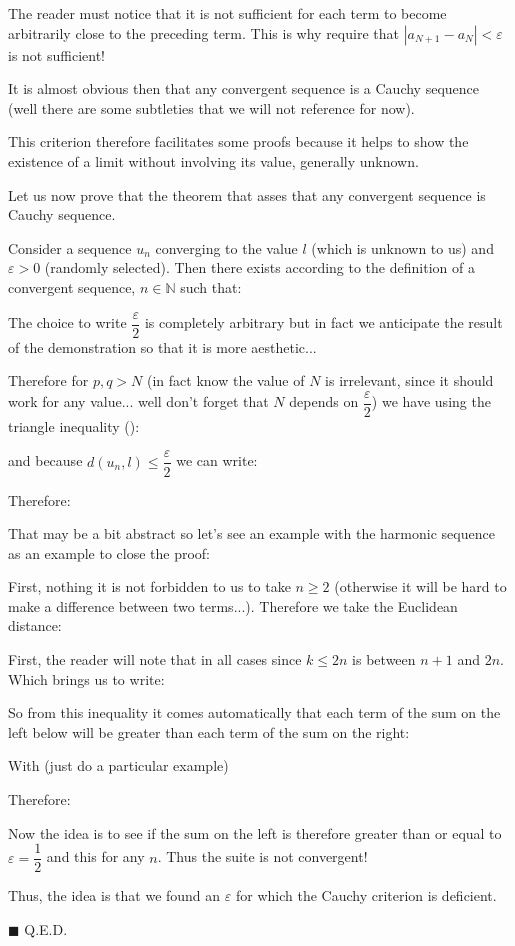 	The reader must notice that it is not sufficient for each term to become arbitrarily close to the preceding term. This is why require that $|a_{N+1} - a_{N}| < \varepsilon$ is not sufficient!

	It is almost obvious then that any convergent sequence is a Cauchy sequence (well there are some subtleties that we will not reference for now).

	\begin{tcolorbox}[title=Remark,colframe=black,arc=10pt]
This criterion therefore facilitates some proofs because it helps to show the existence of a limit without involving its value, generally unknown.
	\end{tcolorbox}
	
	\begin{theorem}
	Let us now prove that the theorem that asses that any convergent sequence is Cauchy sequence.
	\end{theorem}
	\begin{dem}
	Consider a sequence $u_n$ converging to the value $l$ (which is unknown to us) and $\varepsilon>0$ (randomly selected). Then there exists according to the definition of a convergent sequence, $n \in \mathbb{N}$ such that:
	
	The choice to write $\dfrac{\varepsilon}{2}$ is completely arbitrary but in fact we anticipate the result of the demonstration so that it is more aesthetic...
	
	Therefore for $p,q>N$ (in fact know the value of $N$ is irrelevant, since it should work for any value... well don't forget that $N$ depends on $\dfrac{\varepsilon}{2}$) we have using the triangle inequality ():
	
	and because $d(u_n,l)\leq\dfrac{\varepsilon}{2}$ we can write:
	
	Therefore:
	
	That may be a bit abstract so let's see an example with the harmonic sequence as an example to close the proof:
	
	First, nothing it is not forbidden to us to take $n \geq 2$ (otherwise it will be hard to make a difference between two terms...).
	Therefore we take the Euclidean distance:
	
	First, the reader will note that in all cases since $k\leq 2n$ is between $n+1$ and $2n$. Which brings us to write:
	
	So from this inequality it comes automatically that each term of the sum on the left below will be greater than each term of the sum on the right:
	
	With (just do a particular example)
	
	Therefore:
		
	Now the idea is to see if the sum on the left is therefore greater than or equal to $\varepsilon=\dfrac{1}{2}$ and this for any $n$. Thus the suite is not convergent!
	
	Thus, the idea is that we found an $\varepsilon$ for which the Cauchy criterion is deficient.
	\begin{flushright}
		$\blacksquare$  Q.E.D.
	\end{flushright}
	\end{dem}
